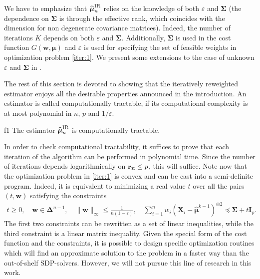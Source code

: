 \documentclass[aos,preprint,reqno]{imsart}
\newcommand\bs{\boldsymbol}
\newcommand\bmu{\boldsymbol\mu}
\newcommand\bSigma{\boldsymbol\Sigma}
\newcommand\bDelta{\boldsymbol\Delta}
\newcommand\bw{\boldsymbol w}
\newcommand\bfI{\mathbf I}
\newcommand\rSigma{\textbf{\textup{r}}_{\scriptscriptstyle\bSigma}}
\def\hat{\widehat}
\theoremstyle{plain}
\theoremstyle{remark}
\begin{document}
	We have to emphasize that $\hat{\bmu}_n^{
	\textup{IR}}$ relies on the knowledge of both $\varepsilon$ and 
	$\bSigma$ (the dependence on $\bSigma$ is through the effective
	rank, which coincides with the dimension for non degenerate covariance 
	matrices). Indeed, the number of iterations $K$ depends on both $\varepsilon$ and $\bSigma$. Additionally, $\bSigma$ is used in 
	the cost function $G(\bw, \bmu)$ and $\varepsilon$ is used for 
	specifying the set of feasible weights in optimization problem \eqref{iter:1}. We present some extensions to the case of unknown
	$\varepsilon$ and $\bSigma$ in . 
	
	The rest of this section is devoted to showing that the 
	iteratively reweighted estimator enjoys all the desirable 
	properties announced in the introduction. An estimator is called
	computationally tractable, if its computational complexity 
	is at most polynomial in $n$, $p$ and $1/\varepsilon$. 

	\begin{center}
	\begin{minipage}{0.90\linewidth}
			\begin{fact}{}{f1}
			The estimator $\hat{\bmu}_n^{\textup{IR}}$ is computationally tractable. 
			\end{fact}
		\end{minipage}
	\end{center}

	In order to check computational tractability, it suffices to prove that
	each iteration of the algorithm can be performed in polynomial time. Since
	the number of iterations depends logarithmically on $\rSigma\le p$, 
	this will suffice. 
	Note now that the optimization problem in \eqref{iter:1} is convex and 
	can be cast into a semi-definite program. Indeed, it is equivalent to 
	minimizing a real value $t$ over all the pairs $(t,\bw)$ satisfying the 
	constraints 
	\begin{align}
	t\ge 0,\quad \bw\in\bDelta^{n-1},\quad 
	\|\bw\|_\infty\le \frac1{n(1-\varepsilon)},\quad
	\sum_{i=1}^n  w_i(\bs X_i-\hat{\bmu}^{k-1})^{\otimes 2} 
	\preceq \bSigma + t\bfI_p.
	\end{align} 
	The first two constraints can be rewritten as a set of linear inequalities, 
	while the third constraint is a linear matrix inequality. Given the special
	form of the cost function and the constraints, it is possible to design
	specific optimization routines which will find an approximate solution to
	the problem in a faster way than the out-of-shelf SDP-solvers. However, 
	we will not pursue this line of research in this work. 
\end{document}
